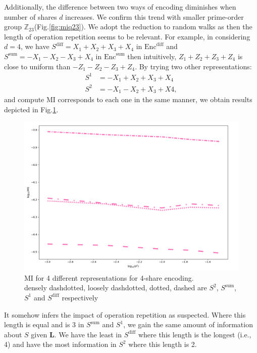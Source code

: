 \documentclass{llncs}
\begin{document}
Additionally, the difference between two ways of encoding diminishes when number of shares $d$ increases. We confirm this trend with smaller prime-order group $\mathbb{Z}_{23}$(Fig.\ref{fig:miq23}). We adopt the reduction to random walks as \cite{optimalmask} then the length of operation repetition seems to be relevant. For example, in considering $d=4$, we have $S^\text{diff} = X_1 + X_2 + X_3 + X_4$ in $\text{Enc}^{\text{diff}}$  and $S^\text{sum} = -X_1 - X_2 - X_3 + X_4$   in $\text{Enc}^{\text{sum}}$ then intuitively, $Z_1 + Z_2 + Z_3 + Z_4$ is close to uniform than $-Z_1 - Z_2 - Z_3 + Z_4$. By trying two other representations:
\begin{align*}
	S^1 &= -X_1 + X_2 + X_3 + X_4\\
	S^2 &= -X_1 - X_2 + X_3 + X4,
\end{align*}
and compute MI corresponds to each one in the same manner, we obtain results depicted in Fig.\ref{fig:mi_4shares}.
\begin{figure}[!h]
	\vspace*{-0.0cm}
	\hspace*{0.0cm}\centering \includegraphics[scale=0.2]{figures/4shares_modes.png}
	\vspace*{0.3cm}
	\caption{MI for 4 different representations for 4-share encoding.\\ densely dashdotted, loosely dashdotted, dotted, dashed are $S^2$, $S^{\text{sum}}$, $S^1$ and $S^{\text{diff}}$ respectively}\label{fig:mi_4shares}\vspace*{-0.0cm}
\end{figure}

It somehow infers the impact of operation repetition as suspected. Where this length is equal and is 3 in $S^\text{sum}$ and $S^1 $, we gain the same amount of information about $S$ given $\bm{L}$. We have the least in $S^\text{diff}$ where this length is the longest (i.e., 4) and have the most information in $S^2$ where this length is 2.
\end{document}
